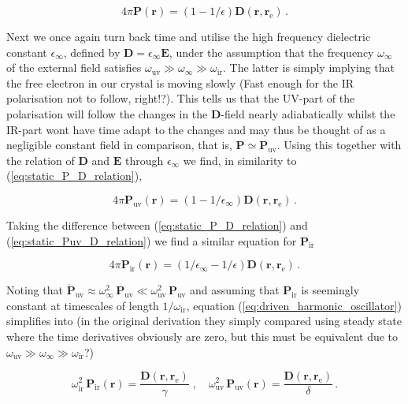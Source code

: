 \documentclass[12pt]{report}
\renewcommand{\vec}[1]{\boldsymbol{\mathbf{#1}}}                        %
\newcommand{\motivation}[1]{{\leavevmode\color{motivation}#1}}
\begin{document}
\begin{equation}
	\label{eq:static_P_D_relation}
	4 \pi \vec P(\vec r) = (1 - 1/\epsilon) \vec D(\vec r, \vec r_\text{e}) \,.
\end{equation}

Next we once again turn back time and utilise the high frequency dielectric constant $ \epsilon_\infty $, defined by $ \vec D = \epsilon_\infty \vec E $, under the assumption that the frequency $ \omega_\infty $ of the external field satisfies  $ \omega_\text{uv} \gg \omega_\infty \gg \omega_\text{ir} $. The latter is simply implying that the free electron in our crystal is moving slowly \motivation{(Fast enough for the IR polarisation not to follow, right!?)}. This tells us that the UV-part of the polarisation will follow the changes in the $ \vec D $-field nearly adiabatically whilst the IR-part wont have time adapt to the changes and may thus be thought of as a negligible constant field in comparison, that is, $ \vec P \simeq \vec P_\text{uv} $. Using this together with the relation of $ \vec D $ and $ \vec E $ through $ \epsilon_\infty $ we find, in similarity to (\ref{eq:static_P_D_relation}),

\begin{equation}
	\label{eq:static_Puv_D_relation}
	4 \pi \vec P_\text{uv} (\vec r) =  (1 - 1/\epsilon_\infty) \vec D(\vec r, \vec r_\text{e}) \,.
\end{equation}

Taking the difference between (\ref{eq:static_P_D_relation}) and (\ref{eq:static_Puv_D_relation}) we find a similar equation for $ \vec P_\text{ir} $

\begin{equation}
	\label{eq:static_Pir_D_relation}
	4 \pi \vec P_\text{ir} (\vec r) =  (1/\epsilon_\infty - 1/\epsilon) \vec D(\vec r, \vec r_\text{e}) \,.
\end{equation}

Noting that $ \ddot{\vec P}_\text{uv} \approx \omega_\infty^2 \, \vec P_\text{uv} \ll \omega_\text{uv}^2 \, \vec P_\text{uv} $ and assuming that $ \vec P_\text{ir} $ is seemingly constant at timescales of length $ 1/\omega_\text{ir} $, equation (\ref{eq:driven_harmonic_oscillator}) simplifies into \motivation{(in the original derivation they simply compared using steady state where the time derivatives obviously are zero, but this must be equivalent due to $ \omega_\text{uv} \gg \omega_\infty \gg \omega_\text{ir} $?)}

\begin{equation}
	\label{eq:driven_harmonic_oscillator}
	\omega^2_\text{ir} \, \vec P_\text{ir} (\vec r) = \frac{ \vec D(\vec r, \vec r_\text{e})}{ \gamma }
	\; , \quad
	\omega^2_\text{uv} \, \vec P_\text{uv} (\vec r) = \frac{ \vec D(\vec r, \vec r_\text{e})}{ \delta } \,.
\end{equation}
\end{document}
